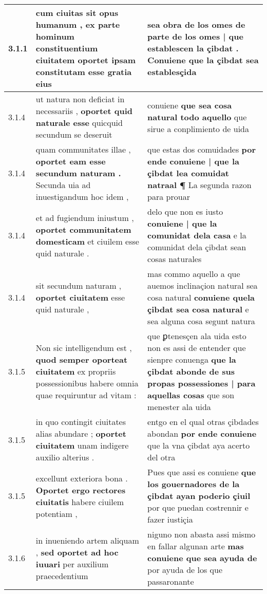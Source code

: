 \begin{tabular}{|p{1cm}|p{6.5cm}|p{6.5cm}|}
3.1.1 & cum ciuitas sit opus humanum , \textbf{ ex parte hominum constituentium ciuitatem oportet } ipsam constitutam esse gratia eius & sea obra de los omes \textbf{ de parte de los omes | que establescen la çibdat . } Conuiene que la çibdat sea establesçida \\\hline
3.1.4 & ut natura non deficiat in necessariis , \textbf{ oportet quid naturale esse } quicquid secundum se deseruit & conuiene \textbf{ que sea cosa natural todo aquello } que sirue a conplimiento de uida \\\hline
3.1.4 & quam communitates illae , \textbf{ oportet eam esse secundum naturam . } Secunda uia ad inuestigandum hoc idem , & que estas dos comuidades \textbf{ por ende conuiene | que la çibdat lea comuidat natraal ¶ } La segunda razon para prouar \\\hline
3.1.4 & et ad fugiendum iniustum , \textbf{ oportet communitatem domesticam } et ciuilem esse quid naturale . & delo que non es iusto \textbf{ conuiene | que la comunidat dela casa } e la comunidat dela çibdat sean cosas naturales \\\hline
3.1.4 & sit secundum naturam , \textbf{ oportet ciuitatem } esse quid naturale , & mas commo aquello a que auemos inclinaçion natural sea cosa natural \textbf{ conuiene quela çibdat sea cosa natural } e sea alguna cosa segunt natura \\\hline
3.1.5 & Non sic intelligendum est , \textbf{ quod semper oporteat ciuitatem } ex propriis possessionibus habere omnia quae requiruntur ad vitam : & que ꝑtenesçen ala uida esto non es assi de entender que sienpre conuenga \textbf{ que la çibdat abonde de sus propas possessiones | para aquellas cosas } que son menester ala uida \\\hline
3.1.5 & in quo contingit ciuitates alias abundare ; \textbf{ oportet ciuitatem } unam indigere auxilio alterius . & entgo en el qual otras çibdades abondan \textbf{ por ende conuiene } que la vna çibdat aya acerto del otra \\\hline
3.1.5 & excellunt exteriora bona . \textbf{ Oportet ergo rectores ciuitatis } habere ciuilem potentiam , & Pues que assi es conuiene \textbf{ que los gouernadores de la çibdat ayan poderio çiuil } por que puedan costrennir e fazer iustiçia \\\hline
3.1.6 & in inueniendo artem aliquam , \textbf{ sed oportet ad hoc iuuari } per auxilium praecedentium & niguno non abasta assi mismo en fallar algunan arte \textbf{ mas conuiene que sea ayuda de } por ayuda de los que passaronante \\\hline

\end{tabular}
